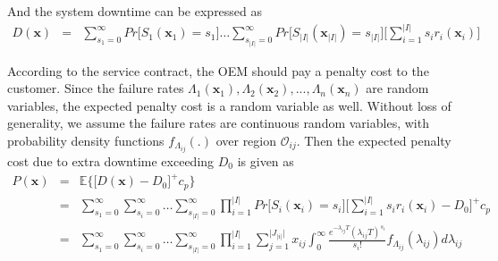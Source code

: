 \documentclass[preprint,12pt]{elsarticle}
\begin{document}
And the system downtime can be expressed as
\begin{eqnarray}
D(\boldsymbol{x}) &=& \sum_{s_{1}=0}^{\infty}{Pr\bigg[S_{1}(\boldsymbol{x}_{1})=s_{1}\bigg]}\dots\sum_{s_{\rvert I \lvert}=0}^{\infty}{Pr\bigg[S_{\rvert I \lvert}(\boldsymbol{x}_{\rvert I \lvert})=s_{\rvert I \lvert}\bigg]} \bigg[\sum_{i=1}^{\rvert I \lvert}{s_{i}r_{i}(\boldsymbol{x}_{i})}\bigg] \label{systemdowntime}
\end{eqnarray}

According to the service contract, the OEM should pay a penalty cost to the customer. Since the failure rates $\Lambda_{1}(\boldsymbol{x}_{1}),\Lambda_{2}(\boldsymbol{x}_{2}),...,\Lambda_{n}(\boldsymbol{x}_{n})$ are random variables, the expected penalty cost is a random variable as well. Without loss of generality, we assume the failure rates are continuous random variables, with probability density functions $f_{\Lambda_{ij}}(.)$ over region $\mathcal{O}_{ij}$. Then the expected penalty cost due to extra downtime exceeding $D_{0}$ is given as
\small
\begin{eqnarray}
P(\boldsymbol{x})& = & \mathbb{E}\bigg\{\bigg[D(\boldsymbol{x})-D_{0}\bigg]^{+} c_{p} \bigg\} \nonumber\\
&=&\sum_{s_{1}=0}^{\infty}\sum_{s_{i}=0}^{\infty}\dots\sum_{s_{\rvert I \lvert}=0}^{\infty}{\prod_{i=1}^{\rvert I \lvert} {Pr\bigg[S_{i}(\boldsymbol{x}_{i})=s_{i}\bigg]}} \bigg[\sum_{i=1}^{\rvert I \lvert}{s_{i}r_{i}(\boldsymbol{x}_{i})}-D_{0}\bigg]^{+}c_{p} \nonumber\\
&=& \sum_{s_{1}=0}^{\infty}\sum_{s_{i}=0}^{\infty}\dots\sum_{s_{\rvert I \lvert}=0}^{\infty}{\prod_{i=1}^{\rvert I \lvert}{\sum_{j=1}^{\rvert J_{\rvert i \lvert} \lvert}{x_{ij}\int_{0}^{\infty}{\frac{e^{-\lambda_{ij}T}(\lambda_{ij}T)^{s_{i}}}{s_{i}!}
f_{\Lambda_{ij}}(\lambda_{ij})d\lambda_{ij}}}}}
\label{penaltycost}
\end{eqnarray}
\normalsize
\end{document}
